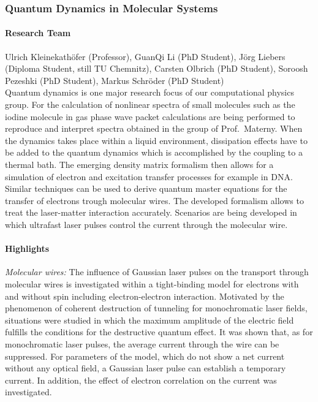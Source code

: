 \subsubsection{Quantum Dynamics in Molecular Systems}
 \label{Nano:Kleinekathoefer}

\paragraph{Research Team}
Ulrich Kleinekath\"ofer (Professor), GuanQi Li (PhD Student), J\"org Liebers
(Diploma Student, still TU Chemnitz), Carsten Olbrich
(PhD Student), Soroosh
Pezeshki (PhD Student), Markus Schr\"oder (PhD Student)\\


Quantum dynamics is one major research focus of our computational physics
group. For the calculation of nonlinear spectra of small molecules such as
the iodine molecule in gas phase wave packet calculations are being
performed to reproduce and interpret spectra obtained in the group of
Prof.\ Materny. When the dynamics takes place within a liquid environment,
dissipation effects have to be added to the quantum dynamics which is
accomplished by the coupling to a thermal bath.  The emerging density
matrix formalism then allows for a simulation of electron and excitation
transfer processes for example in DNA. Similar techniques can be used to
derive quantum master equations for the transfer of electrons trough
molecular wires. The developed formalism allows to treat the laser-matter
interaction accurately. Scenarios are being developed in which ultrafast
laser pulses control the current through the molecular wire.


\paragraph{Highlights}


\emph{Molecular wires:} The influence of Gaussian laser pulses on the
transport through molecular wires is investigated within a tight-binding
model for electrons with and without spin including electron-electron
interaction. Motivated by the phenomenon of coherent destruction of
tunneling for monochromatic laser fields, situations were studied in which
the maximum amplitude of the electric field fulfills the conditions for the
destructive quantum effect.  It was shown that, as for monochromatic laser
pulses, the average current through the wire can be suppressed.  For
parameters of the model, which do not show a net current without any
optical field, a Gaussian laser pulse can establish a temporary current. In
addition, the effect of electron correlation on the current was
investigated.


